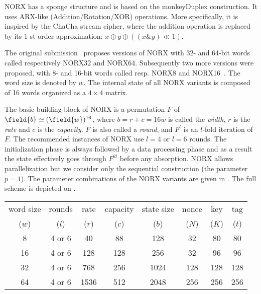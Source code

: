 
NORX has a sponge structure and is based on the monkeyDuplex construction. It uses ARX-like (Addition/Rotation/XOR) operations. More specifically, it is inspired by the ChaCha stream cipher, where the addition operation is replaced by its 1-st order approximation: $x \oplus y \oplus ((x \& y) \ll 1)$.

The original submission~\cite{NORX} proposes versions of NORX with 32- and 64-bit words called respectively NORX32 and NORX64. Subsequently two more versions were proposed, with 8- and 16-bit words called resp. NORX8 and NORX16~\cite{aumasson2015norx8}. The word size is denoted by $w$. The internal state of all NORX variants is composed of 16 words organized as a $4 \times 4$ matrix.

The basic building block of NORX is a permutation $F$ of $\field{b} \simeq (\field{w})^{16}$, where $b = r + c = 16w$ is called the {\it width}, $r$ is the {\it rate} and $c$ is the {\it capacity}. $F$ is also called a {\it round}, and $F^{l}$ is an $l$-fold iteration of $F$. The recommended instances of NORX use $l = 4$ or $l = 6$ rounds. The initialization phase is always followed by a data processing phase and as a result the state effectively goes through $F^{2l}$ before any absorption. NORX allows parallelization but we consider only the sequential construction (the parameter $p=1$). The parameter combinations of the NORX variants are given in . The full scheme is depicted on .

\begin{table}[ht]
    \centering
    \begin{tabular}{c|c|ccc|c|c|c}
    \toprule
    
    word size & rounds & rate & capacity & state size & nonce & key & tag \\
    ($w$) & ($l$) & ($r$) & ($c$) & ($b$) & ($N$) & ($K$) & ($t$) \\
    
    \midrule
    
    8  & 4 or 6 & 40 & 88 & 128     & 32 & 80 & 80 \\
    16 & 4 or 6 & 128 & 128 & 256   & 32 & 96 & 96 \\
    32 & 4 or 6 & 768 & 256 & 1024  & 128 & 128 & 128 \\
    64 & 4 or 6 & 1536 & 512 & 2048 & 256 & 256 & 256 \\
    
    \bottomrule
    \end{tabular}
\end{table}

